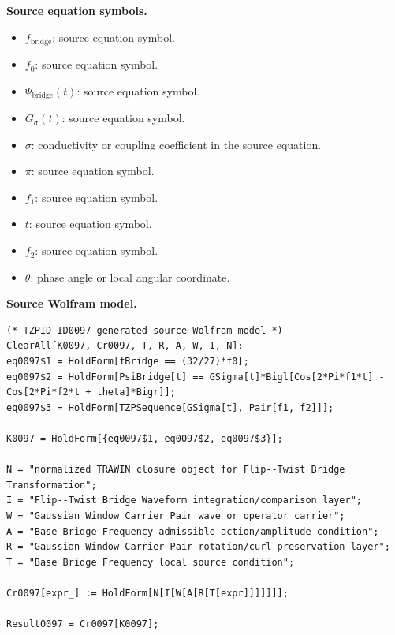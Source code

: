 \begin{minipage}[t]{0.49\linewidth}
\begingroup
\small
\raggedright
\textbf{Source equation symbols.}\par
\begin{itemize}[leftmargin=1.35em,itemsep=1pt,topsep=1pt,parsep=0pt]
    \item $f_{\mathrm{bridge}}$: source equation symbol.
    \item $f_0$: source equation symbol.
    \item $\Psi_{\mathrm{bridge}}(t)$: source equation symbol.
    \item $G_{\sigma}(t)$: source equation symbol.
    \item $\sigma$: conductivity or coupling coefficient in the source equation.
    \item $\pi$: source equation symbol.
    \item $f_1$: source equation symbol.
    \item $t$: source equation symbol.
    \item $f_2$: source equation symbol.
    \item $\theta$: phase angle or local angular coordinate.
\end{itemize}
\endgroup
\end{minipage}\hfill
\begin{minipage}[t]{0.47\linewidth}
\begingroup
\scriptsize
\raggedright
\textbf{Source Wolfram model.}\par
\begin{Verbatim}[fontsize=\tiny,breaklines=true,breakanywhere=true]
(* TZPID ID0097 generated source Wolfram model *)
ClearAll[K0097, Cr0097, T, R, A, W, I, N];
eq0097$1 = HoldForm[fBridge == (32/27)*f0];
eq0097$2 = HoldForm[PsiBridge[t] == GSigma[t]*Bigl[Cos[2*Pi*f1*t] - Cos[2*Pi*f2*t + theta]*Bigr]];
eq0097$3 = HoldForm[TZPSequence[GSigma[t], Pair[f1, f2]]];

K0097 = HoldForm[{eq0097$1, eq0097$2, eq0097$3}];

N = "normalized TRAWIN closure object for Flip--Twist Bridge Transformation";
I = "Flip--Twist Bridge Waveform integration/comparison layer";
W = "Gaussian Window Carrier Pair wave or operator carrier";
A = "Base Bridge Frequency admissible action/amplitude condition";
R = "Gaussian Window Carrier Pair rotation/curl preservation layer";
T = "Base Bridge Frequency local source condition";

Cr0097[expr_] := HoldForm[N[I[W[A[R[T[expr]]]]]]];

Result0097 = Cr0097[K0097];
\end{Verbatim}
\endgroup
\end{minipage}

